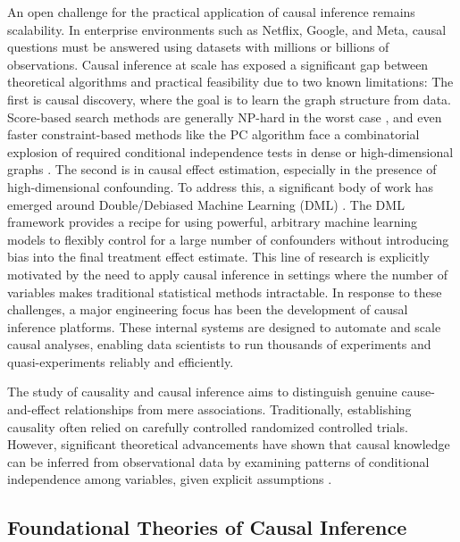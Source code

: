 {An open challenge for the practical application of causal inference remains scalability. In enterprise environments such as Netflix, Google, and Meta, causal questions must be answered using datasets with millions or billions of observations. Causal inference at scale has exposed a significant gap between theoretical algorithms and practical feasibility due to two known limitations:
\newline
The first is causal discovery, where the goal is to learn the graph structure from data. Score-based search methods are generally NP-hard in the worst case \cite{Chickering2002Optimal}, and even faster constraint-based methods like the PC algorithm face a combinatorial explosion of required conditional independence tests in dense or high-dimensional graphs \cite{Kalisch2007Estimating}.
\newline
 The second is in causal effect estimation, especially in the presence of high-dimensional confounding. To address this, a significant body of work has emerged around Double/Debiased Machine Learning (DML) \cite{Chernozhukov2018Double}. The DML framework provides a recipe for using powerful, arbitrary machine learning models to flexibly control for a large number of confounders without introducing bias into the final treatment effect estimate. This line of research is explicitly motivated by the need to apply causal inference in settings where the number of variables makes traditional statistical methods intractable.
 In response to these challenges, a major engineering focus has been the development of causal inference platforms. These internal systems are designed to automate and scale causal analyses, enabling data scientists to run thousands of experiments and quasi-experiments reliably and efficiently. 
 
\newpage

The study of causality and causal inference aims to distinguish genuine cause-and-effect relationships from mere associations. Traditionally, establishing causality often relied on carefully controlled randomized controlled trials. However, significant theoretical advancements have shown that causal knowledge can be inferred from observational data by examining patterns of conditional independence among variables, given explicit assumptions \cite{pearl2018theoretical}.



\subsection{Foundational Theories of Causal Inference}
\label{subsec:foundational_theories}

}
